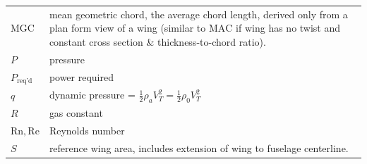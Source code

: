 \documentclass[
]{book}
\begin{document}
\begin{longtable}[]{@{}ll@{}}
\begin{minipage}[t]{0.22\columnwidth}
\(\mathrm{MGC}\)\strut
\end{minipage} & \begin{minipage}[t]{0.72\columnwidth}\raggedright
mean geometric chord, the average chord length, derived only from a plan form view of a wing (similar to \(\mathrm{MAC}\) if wing has no twist and constant cross section \& thickness-to-chord ratio).\strut
\end{minipage}\tabularnewline
\begin{minipage}[t]{0.22\columnwidth}\raggedright
\(P\)\strut
\end{minipage} & \begin{minipage}[t]{0.72\columnwidth}\raggedright
pressure\strut
\end{minipage}\tabularnewline
\begin{minipage}[t]{0.22\columnwidth}\raggedright
\(P_\text{req'd}\)\strut
\end{minipage} & \begin{minipage}[t]{0.72\columnwidth}\raggedright
power required\strut
\end{minipage}\tabularnewline
\begin{minipage}[t]{0.22\columnwidth}\raggedright
\(q\)\strut
\end{minipage} & \begin{minipage}[t]{0.72\columnwidth}\raggedright
dynamic pressure = \(\frac{1}{2} \rho_a V_T^2 = \frac{1}{2} \rho_0 V_T^2\)\strut
\end{minipage}\tabularnewline
\begin{minipage}[t]{0.22\columnwidth}\raggedright
\(R\)\strut
\end{minipage} & \begin{minipage}[t]{0.72\columnwidth}\raggedright
gas constant\strut
\end{minipage}\tabularnewline
\begin{minipage}[t]{0.22\columnwidth}\raggedright
\(\mathrm{Rn},\mathrm{Re}\)\strut
\end{minipage} & \begin{minipage}[t]{0.72\columnwidth}\raggedright
Reynolds number\strut
\end{minipage}\tabularnewline
\begin{minipage}[t]{0.22\columnwidth}\raggedright
\(S\)\strut
\end{minipage} & \begin{minipage}[t]{0.72\columnwidth}\raggedright
reference wing area, includes extension of wing to fuselage centerline.\strut
\end{minipage}\tabularnewline

\end{longtable}
\end{document}
